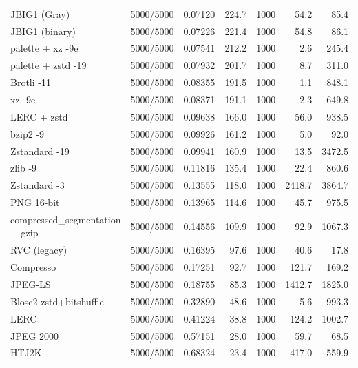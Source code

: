 \begin{table}[t]
\begin{tabular}{lrrrrrr}
JBIG1 (Gray) & 5000/5000 & 0.07120 & 224.7 & 1000 & 54.2 & 85.4 \\
JBIG1 (binary) & 5000/5000 & 0.07226 & 221.4 & 1000 & 54.8 & 86.1 \\
palette + xz -9e & 5000/5000 & 0.07541 & 212.2 & 1000 & 2.6 & 245.4 \\
palette + zstd -19 & 5000/5000 & 0.07932 & 201.7 & 1000 & 8.7 & 311.0 \\
Brotli -11 & 5000/5000 & 0.08355 & 191.5 & 1000 & 1.1 & 848.1 \\
xz -9e & 5000/5000 & 0.08371 & 191.1 & 1000 & 2.3 & 649.8 \\
LERC + zstd & 5000/5000 & 0.09638 & 166.0 & 1000 & 56.0 & 938.5 \\
bzip2 -9 & 5000/5000 & 0.09926 & 161.2 & 1000 & 5.0 & 92.0 \\
Zstandard -19 & 5000/5000 & 0.09941 & 160.9 & 1000 & 13.5 & 3472.5 \\
zlib -9 & 5000/5000 & 0.11816 & 135.4 & 1000 & 22.4 & 860.6 \\
Zstandard -3 & 5000/5000 & 0.13555 & 118.0 & 1000 & 2418.7 & 3864.7 \\
PNG 16-bit & 5000/5000 & 0.13965 & 114.6 & 1000 & 45.7 & 975.5 \\
compressed\_segmentation + gzip & 5000/5000 & 0.14556 & 109.9 & 1000 & 92.9 & 1067.3 \\
RVC (legacy) & 5000/5000 & 0.16395 & 97.6 & 1000 & 40.6 & 17.8 \\
Compresso & 5000/5000 & 0.17251 & 92.7 & 1000 & 121.7 & 169.2 \\
JPEG-LS & 5000/5000 & 0.18755 & 85.3 & 1000 & 1412.7 & 1825.0 \\
Blosc2 zstd+bitshuffle & 5000/5000 & 0.32890 & 48.6 & 1000 & 5.6 & 993.3 \\
LERC & 5000/5000 & 0.41224 & 38.8 & 1000 & 124.2 & 1002.7 \\
JPEG 2000 & 5000/5000 & 0.57151 & 28.0 & 1000 & 59.7 & 68.5 \\
HTJ2K & 5000/5000 & 0.68324 & 23.4 & 1000 & 417.0 & 559.9 \\
\hline
\end{tabular}
\end{table}
